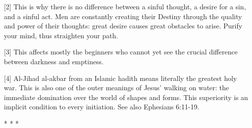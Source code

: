 [2] This is why there is no difference between a sinful thought, a desire for a sin, and a sinful act. Men are constantly creating their Destiny through the quality and power of their thoughts: great desire causes great obstacles to arise. Purify your mind, thus straighten your path.

[3] This affects mostly the beginners who cannot yet see the crucial difference between darkness and emptiness.

[4] Al-Jihad al-akbar from an Islamic hadith means literally the greatest holy war. This is also one of the outer meanings of Jesus' walking on water: the immediate domination over the world of shapes and forms. This superiority is an implicit condition to every initiation. See also Ephesians 6:11-19.




\begin{center}* * *\end{center}

